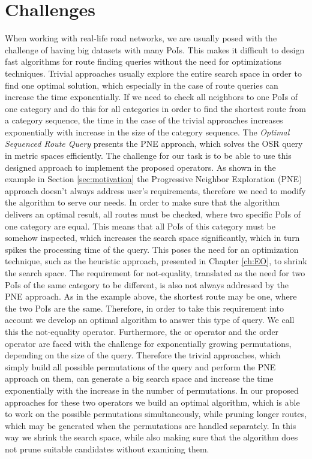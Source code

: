\section{Challenges}
When working with real-life road networks, we are usually posed with the challenge of having big datasets with many PoIs. This makes it difficult to design fast algorithms for route finding queries without the need for optimizations techniques. Trivial approaches usually explore the entire search space in order to find one optimal solution, which especially in the case of route queries can increase the time exponentially. If we need to check all neighbors to one PoIs of one category and do this for all categories in order to find the shortest route from a category sequence, the time in the case of the trivial approaches increases exponentially with increase in the size of the category sequence. The \textit{Optimal Sequenced Route Query} \cite{OSR} presents the PNE approach, which solves the OSR query in metric spaces efficiently. The challenge for our task is to be able to use this designed approach to implement the proposed operators. \newline
As shown in the example in Section \ref{sec:motivation} the Progressive Neighbor Exploration (PNE) approach doesn't always address user's requirements, therefore we need to modify the algorithm to serve our needs. In order to make sure that the algorithm delivers an optimal result, all routes must be checked, where two specific PoIs of one category are equal. This means that all PoIs of this category must be somehow inspected, which increases the search space significantly, which in turn spikes the processing time of the query. This poses the need for an optimization technique, such as the heuristic approach, presented in Chapter \ref{ch:EO}, to shrink the search space. \newline
The requirement for not-equality, translated as the need for two PoIs of the same category to be different, is also not always addressed by the PNE approach. As in the example above, the shortest route may be one, where the two PoIs are the same. Therefore, in order to take this requirement into account we develop an optimal algorithm to answer this type of query. We call this the not-equality operator. \newline
Furthermore, the or operator and the order operator are faced with the challenge for exponentially growing permutations, depending on the size of the query. Therefore the trivial approaches, which simply build all possible permutations of the query and perform the PNE approach on them, can generate a big search space and increase the time exponentially with the increase in the number of permutations. In our proposed approaches for these two operators we build an optimal algorithm, which is able to work on the possible permutations simultaneously, while pruning longer routes, which may be generated when the permutations are handled separately. In this way we shrink the search space, while also making sure that the algorithm does not prune suitable candidates without examining them.

